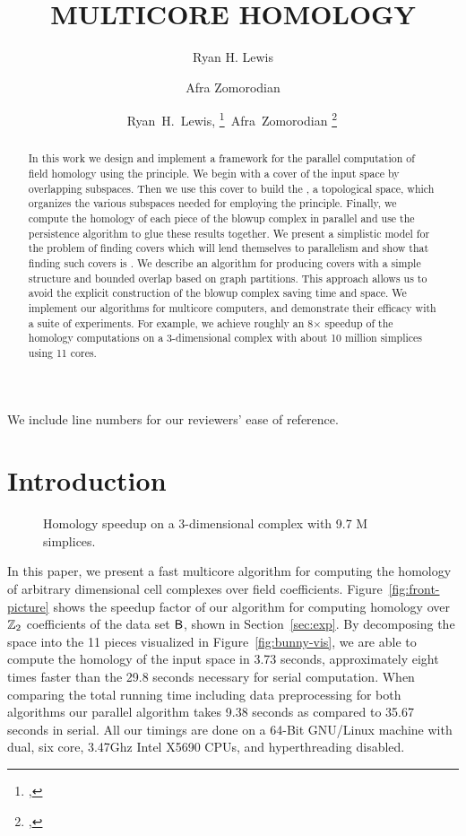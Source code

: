 \documentclass{jocg}
\title{\MakeUppercase{Multicore Homology}}
\author{Ryan H. Lewis \and Afra Zomorodian}
\author{%
  Ryan~H.~Lewis,%
  \thanks{\affil{Stanford University}, 
          \email{rhl@stanford.edu}}\,
  Afra~Zomorodian%
  \thanks{\affil{D.E. Shaw},
          \email{afra@cs.dartmouth.edu}}\,
}
\begin{document}
\DRAFT
\maketitle

\begin{abstract}
In this work we design and implement a framework for the parallel computation of field homology using the \mv principle. We begin with a cover of the input space
by overlapping subspaces. Then we use this cover to build the \mvb{}, a topological space, which organizes
the various subspaces needed for employing the \mv principle. Finally, we compute the homology of each piece of the blowup
complex in parallel and use the persistence algorithm to glue these results together. We present a simplistic model for the problem of finding covers which will lend themselves to parallelism and show that finding such covers is \NPH{}.
We describe an algorithm for producing covers with a simple structure and bounded overlap based on graph partitions. This approach allows
us to avoid the explicit construction of the blowup complex saving time and space. We implement our algorithms for multicore computers, and demonstrate their efficacy with a suite of experiments. For example, we achieve roughly an 8$\times$ speedup of the homology computations on a 3-dimensional complex with about 10 million simplices using 11 cores.
\end{abstract}
\begin{center}
We include line numbers for our reviewers' ease of reference. \\
\end{center}
\pagebreak
\section{Introduction}
\begin{figure}
\subfigure[We achieve a 68.9\% efficiency on 11 cores. The line $\mathit{y=x}$ 
displays perfect efficiency.]{
\scalebox{.6}{}
\label{fig:front-picture}
}
\hfill
{}
\caption{Homology speedup on a 3-dimensional complex with 9.7 M
	simplices.}
\end{figure}
In this paper, we present a fast multicore algorithm for computing
the homology of arbitrary dimensional cell complexes over field
coefficients. Figure~\ref{fig:front-picture} shows the speedup factor
of our algorithm for computing homology over $\mathbb{Z}_2$ coefficients
of the data set ${\textsf{B}}$, shown in Section~\ref{sec:exp}. By decomposing the 
space into the 11 pieces visualized in Figure~\ref{fig:bunny-vis}, 
we are able to compute the homology of the input space in 
3.73 seconds, approximately eight times faster than the 29.8 seconds 
necessary for serial computation. When comparing the total running time 
including data preprocessing for both algorithms our parallel algorithm
takes 9.38 seconds as compared to 35.67 seconds in serial. 
All our timings are done on a 64-Bit GNU/Linux machine with dual, six core, 
3.47Ghz Intel X5690 CPUs, and hyperthreading disabled.
\end{document}
